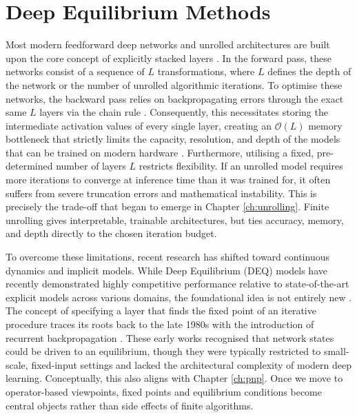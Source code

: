 \chapter{Deep Equilibrium Methods}\label{ch:deq}

Most modern feedforward deep networks and unrolled architectures are built upon the core concept of explicitly stacked layers \cite{bai2019deep}. In the forward pass, these networks consist of a sequence of $L$ transformations, where $L$ defines the depth of the network or the number of unrolled algorithmic iterations. To optimise these networks, the backward pass relies on backpropagating errors through the exact same $L$ layers via the chain rule \cite{rumelhart1986learning}. Consequently, this necessitates storing the intermediate activation values of every single layer, creating an $\mathcal{O}(L)$ memory bottleneck that strictly limits the capacity, resolution, and depth of the models that can be trained on modern hardware \cite{bai2019deep, kolter2020deepimplicit}. Furthermore, utilising a fixed, pre-determined number of layers $L$ restricts flexibility. If an unrolled model requires more iterations to converge at inference time than it was trained for, it often suffers from severe truncation errors and mathematical instability. This is precisely the trade-off that began to emerge in Chapter \ref{ch:unrolling}. Finite unrolling gives interpretable, trainable architectures, but ties accuracy, memory, and depth directly to the chosen iteration budget.

To overcome these limitations, recent research has shifted toward continuous dynamics and implicit models. While Deep Equilibrium (DEQ) models have recently demonstrated highly competitive performance relative to state-of-the-art explicit models across various domains, the foundational idea is not entirely new \cite{bai2019deep}. The concept of specifying a layer that finds the fixed point of an iterative procedure traces its roots back to the late 1980s with the introduction of recurrent backpropagation \cite{almeida1987learning, pineda1987generalization}. These early works recognised that network states could be driven to an equilibrium, though they were typically restricted to small-scale, fixed-input settings and lacked the architectural complexity of modern deep learning. Conceptually, this also aligns with Chapter \ref{ch:pnp}. Once we move to operator-based viewpoints, fixed points and equilibrium conditions become central objects rather than side effects of finite algorithms.

